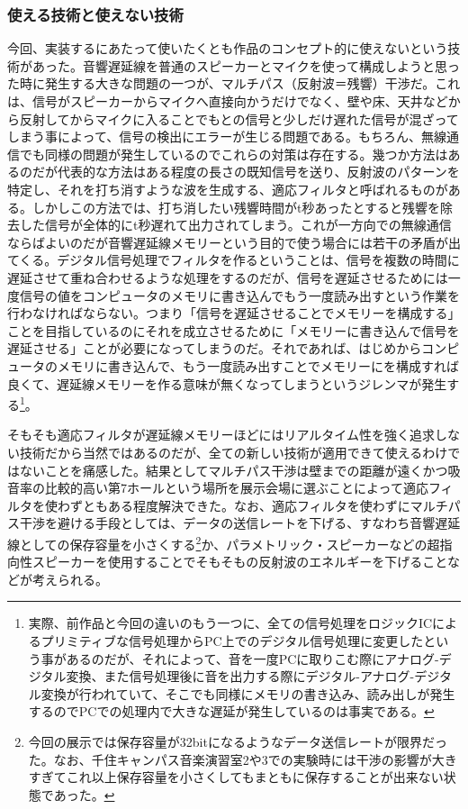 \documentclass[a4paper,report]{jsbook}
\begin{document}
\subsubsection{使える技術と使えない技術}\label{ux4f7fux3048ux308bux6280ux8853ux3068ux4f7fux3048ux306aux3044ux6280ux8853}

今回、実装するにあたって使いたくとも作品のコンセプト的に使えないという技術があった。音響遅延線を普通のスピーカーとマイクを使って構成しようと思った時に発生する大きな問題の一つが、マルチパス（反射波＝残響）干渉だ。これは、信号がスピーカーからマイクへ直接向かうだけでなく、壁や床、天井などから反射してからマイクに入ることでもとの信号と少しだけ遅れた信号が混ざってしまう事によって、信号の検出にエラーが生じる問題である。もちろん、無線通信でも同様の問題が発生しているのでこれらの対策は存在する。幾つか方法はあるのだが代表的な方法はある程度の長さの既知信号を送り、反射波のパターンを特定し、それを打ち消すような波を生成する、適応フィルタと呼ばれるものがある。しかしこの方法では、打ち消したい残響時間がt秒あったとすると残響を除去した信号が全体的にt秒遅れて出力されてしまう\autocite{ochi:underwater}。これが一方向での無線通信ならばよいのだが音響遅延線メモリーという目的で使う場合には若干の矛盾が出てくる。デジタル信号処理でフィルタを作るということは、信号を複数の時間に遅延させて重ね合わせるような処理をするのだが、信号を遅延させるためには一度信号の値をコンピュータのメモリに書き込んでもう一度読み出すという作業を行わなければならない。つまり「信号を遅延させることでメモリーを構成する」ことを目指しているのにそれを成立させるために「メモリーに書き込んで信号を遅延させる」ことが必要になってしまうのだ。それであれば、はじめからコンピュータのメモリに書き込んで、もう一度読み出すことでメモリーにを構成すれば良くて、遅延線メモリーを作る意味が無くなってしまうというジレンマが発生する\footnote{実際、前作品と今回の違いのもう一つに、全ての信号処理をロジックICによるプリミティブな信号処理からPC上でのデジタル信号処理に変更したという事があるのだが、それによって、音を一度PCに取りこむ際にアナログ-デジタル変換、また信号処理後に音を出力する際にデジタル-アナログ-デジタル変換が行われていて、そこでも同様にメモリの書き込み、読み出しが発生するのでPCでの処理内で大きな遅延が発生しているのは事実である。}。

そもそも適応フィルタが遅延線メモリーほどにはリアルタイム性を強く追求しない技術だから当然ではあるのだが、全ての新しい技術が適用できて使えるわけではないことを痛感した。結果としてマルチパス干渉は壁までの距離が遠くかつ吸音率の比較的高い第7ホールという場所を展示会場に選ぶことによって適応フィルタを使わずともある程度解決できた。なお、適応フィルタを使わずにマルチパス干渉を避ける手段としては、データの送信レートを下げる、すなわち音響遅延線としての保存容量を小さくする\footnote{今回の展示では保存容量が32bitになるようなデータ送信レートが限界だった。なお、千住キャンパス音楽演習室2や3での実験時には干渉の影響が大きすぎてこれ以上保存容量を小さくしてもまともに保存することが出来ない状態であった。}か、パラメトリック・スピーカーなどの超指向性スピーカーを使用することでそもそもの反射波のエネルギーを下げることなどが考えられる。
\end{document}
